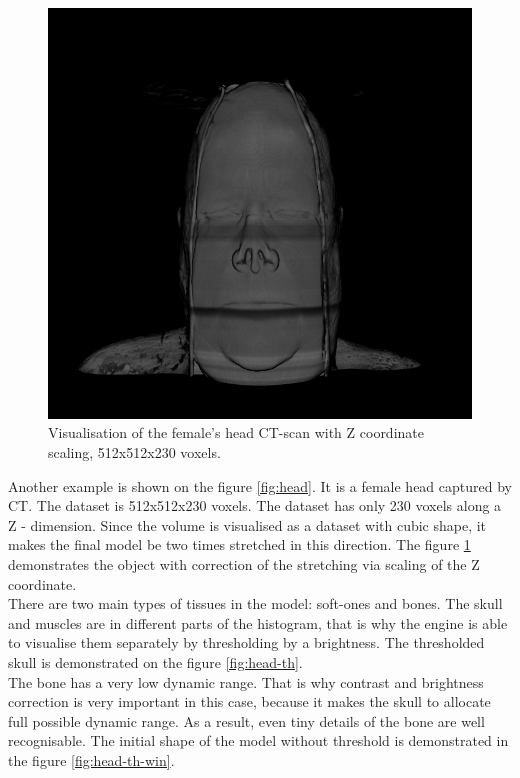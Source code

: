 \documentclass[twoside, english, 11pt]{report}
\begin{document}
\begin{figure}[H]
\centerline{\includegraphics[scale = 0.65]{img/head-zcor}}
\caption{Visualisation of the female's head CT-scan with Z coordinate scaling, 512x512x230 voxels.\label{fig:head-zcor}}
\end{figure}
Another example is shown on the figure \ref{fig:head}. It is a female head captured by CT. The dataset is 512x512x230 voxels. The dataset has only 230 voxels along a Z - dimension. Since the volume is visualised as a dataset with cubic shape, it makes the final model be two times stretched in this direction. The figure \ref{fig:head-zcor} demonstrates the object with correction of the stretching via scaling of the Z coordinate.\\

There are two main types of tissues in the model: soft-ones and bones. The skull and muscles are in different parts of the histogram, that is why the engine is able to visualise them separately by thresholding by a brightness. The thresholded skull is demonstrated on the figure \ref{fig:head-th}.\\

The bone has a very low dynamic range. That is why contrast and brightness correction is very important in this case, because it makes the skull to allocate full possible dynamic range. As a result, even tiny details of the bone are well recognisable. The initial shape of the model without threshold is demonstrated in the figure \ref{fig:head-th-win}. \\
\end{document}
